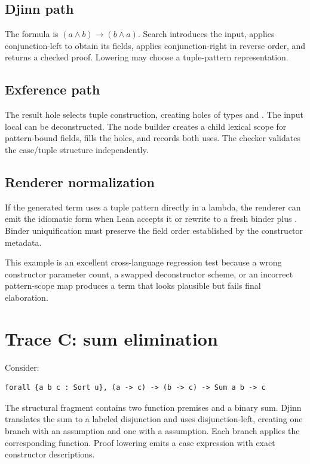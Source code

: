 \documentclass[10pt,letterpaper,oneside]{report}
\newcommand{\code}[1]{\texttt{\detokenize{#1}}}
\begin{document}
\subsection{Djinn path}

The formula is \((a \wedge b) \to (b \wedge a)\). Search introduces the input, applies conjunction-left to obtain its fields, applies conjunction-right in reverse order, and returns a checked proof. Lowering may choose a tuple-pattern representation.

\subsection{Exference path}

The result hole selects tuple construction, creating holes of types \code{b} and \code{a}. The input local can be deconstructed. The node builder creates a child lexical scope for pattern-bound fields, fills the holes, and records both uses. The checker validates the case/tuple structure independently.

\subsection{Renderer normalization}

If the generated term uses a tuple pattern directly in a lambda, the renderer can emit the idiomatic form when Lean accepts it or rewrite to a fresh binder plus \code{match}. Binder uniquification must preserve the field order established by the constructor metadata.

This example is an excellent cross-language regression test because a wrong constructor parameter count, a swapped deconstructor scheme, or an incorrect pattern-scope map produces a term that looks plausible but fails final elaboration.

\section{Trace C: sum elimination}

Consider:

\begin{lstlisting}[language=Leanish]
forall {a b c : Sort u}, (a -> c) -> (b -> c) -> Sum a b -> c
\end{lstlisting}

The structural fragment contains two function premises and a binary sum. Djinn translates the sum to a labeled disjunction and uses disjunction-left, creating one branch with an \code{a} assumption and one with a \code{b} assumption. Each branch applies the corresponding function. Proof lowering emits a case expression with exact constructor descriptions.
\end{document}
